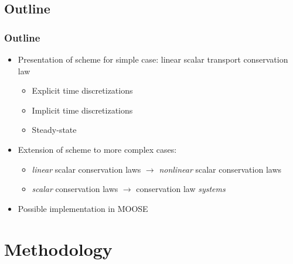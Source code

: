 \documentclass{beamer}
\begin{document}
\subsection{Outline}
\begin{frame}
\frametitle{Outline}

\begin{itemize}
   \item Presentation of scheme for simple case: linear scalar transport
      conservation law
   \begin{itemize}
      \item Explicit time discretizations
      \item Implicit time discretizations
      \item Steady-state
   \end{itemize}
   \item Extension of scheme to more complex cases:
   \begin{itemize}
      \item \emph{linear} scalar conservation laws $\rightarrow$ \emph{nonlinear}
         scalar conservation laws
      \item \emph{scalar} conservation laws $\rightarrow$ conservation law
         \emph{systems}
   \end{itemize}
   \item Possible implementation in MOOSE
\end{itemize}

\end{frame}
\section{Methodology}
\end{document}
